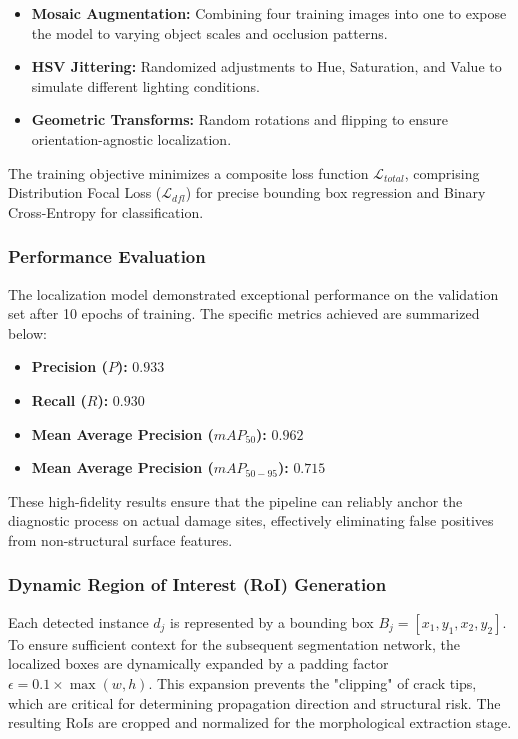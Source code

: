 \begin{itemize}[noitemsep]
    \item \textbf{Mosaic Augmentation:} Combining four training images into one to expose the model to varying object scales and occlusion patterns.
    \item \textbf{HSV Jittering:} Randomized adjustments to Hue, Saturation, and Value to simulate different lighting conditions.
    \item \textbf{Geometric Transforms:} Random rotations and flipping to ensure orientation-agnostic localization.
\end{itemize}

\begin{sloppypar}
The training objective minimizes a composite loss function $\mathcal{L}_{total}$, comprising Distribution Focal Loss ($\mathcal{L}_{dfl}$) for precise bounding box regression and Binary Cross-Entropy for classification.
\end{sloppypar}

\subsubsection{Performance Evaluation}
\noindent The localization model demonstrated exceptional performance on the validation set after 10 epochs of training. The specific metrics achieved are summarized below:

\begin{itemize}[noitemsep,leftmargin=1.5em]
    \item \textbf{Precision ($P$):} $0.933$
    \item \textbf{Recall ($R$):} $0.930$
    \item \textbf{Mean Average Precision ($mAP_{50}$):} $0.962$
    \item \textbf{Mean Average Precision ($mAP_{50-95}$):} $0.715$
\end{itemize}

\begin{sloppypar}
These high-fidelity results ensure that the pipeline can reliably anchor the diagnostic process on actual damage sites, effectively eliminating false positives from non-structural surface features.
\end{sloppypar}

\subsubsection{Dynamic Region of Interest (RoI) Generation}
\begin{sloppypar}
Each detected instance $d_j$ is represented by a bounding box $B_j = [x_1, y_1, x_2, y_2]$. To ensure sufficient context for the subsequent segmentation network, the localized boxes are dynamically expanded by a padding factor $\epsilon = 0.1 \times \max(w, h)$. This expansion prevents the "clipping" of crack tips, which are critical for determining propagation direction and structural risk. The resulting RoIs are cropped and normalized for the morphological extraction stage.
\end{sloppypar}
